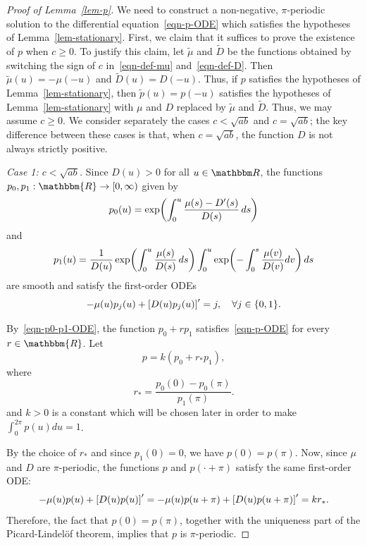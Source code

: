 \documentclass[11pt]{article}
\theoremstyle{plain}
\theoremstyle{definition}
\numberwithin{equation}{section}
\newcommand{\eqbn}{\begin{equation*}}
\newcommand{\eqen}{\end{equation*}}
\newcommand{\BB}{\mathbbm}
\newcommand{\rta}{\rightarrow}
\newcommand{\wt}{\widetilde}
\let\originalleft\left
\let\originalright\right
\renewcommand{\left}{\mathopen{}\mathclose\bgroup\originalleft}
\renewcommand{\right}{\aftergroup\egroup\originalright}
\begin{document}
  

\begin{proof}[Proof of Lemma~\ref{lem-p}]
We need to construct a non-negative, $\pi$-periodic solution to the differential equation~\eqref{eqn-p-ODE} which satisfies the hypotheses of Lemma~\ref{lem-stationary}. 
First, we claim that it suffices to prove the existence of $p$ when $c \geq 0$. To justify this claim, let $\wt \mu$ and $\wt D$ be the functions obtained by switching the sign of $c$ in~\eqref{eqn-def-mu} and~\eqref{eqn-def-D}.  Then $\wt \mu(u) = -\mu(-u)$ and $\wt D(u) = D(-u)$.  Thus, if $p$ satisfies the hypotheses of Lemma~\ref{lem-stationary}, then $\wt p(u) = p(-u)$ satisfies the hypotheses of Lemma~\ref{lem-stationary} with $\mu$ and $D$ replaced by $\wt \mu$ and $\wt D$. Thus, we may assume $c \geq 0$. We consider separately the cases  $c < \sqrt{ab}$ and $c = \sqrt{ab}$; the key difference between these cases is that, when $c = \sqrt{ab}$, the function $D$ is not always strictly positive.
\medskip

\noindent \emph{Case 1: $c < \sqrt{ab}$.}
Since $D(u) > 0$ for all $u\in\BB R$, the functions $p_0,p_1:\BB{R} \rta [0,\infty)$ given by 
\begin{equation}
p_0(u) =  \exp\left(\int_0^u \frac{\mu(s) - D'(s)}{D(s)} \, ds \right) 
\label{eqn-defn-p0}
\end{equation}
and
\begin{equation}
p_1(u) =  \frac{1}{D(u)} \exp\left(\int_0^u \frac{\mu(s)}{D(s)}\, ds \right)
\int_0^u \exp\left(-\int_0^s \frac{\mu(v)}{D(v)} dv \right)\, ds 
\label{eqn-defn-p1}
\end{equation}
are smooth and satisfy the first-order ODEs 
\begin{equation}
-\mu(u) p_j(u) +  \left[ D(u) p_j(u) \right]' = j, \quad \forall j \in \{0,1\} .
\label{eqn-p0-p1-ODE}
\end{equation}

By~\eqref{eqn-p0-p1-ODE}, the function $p_0 + r p_1$ satisfies~\eqref{eqn-p-ODE} for every $r \in \BB{R}$.  Let 
\[
p = k(p_0 + r_* p_1) , 
\]
where
\[
r_* = \frac{p_0(0) - p_0(\pi)}{p_1(\pi)}.
\]
and $k > 0$ is a constant which will be chosen later in order to make $\int_0^{2\pi} p(u) du = 1$.

By the choice of $r_*$ and since $p_1(0) = 0$, we have $p(0) = p(\pi)$.  Now, since $\mu$ and $D$ are $\pi$-periodic, the functions $p$ and $p(\cdot + \pi)$ satisfy the same first-order ODE:
\eqbn
-\mu(u) p(u) +  \left[ D(u) p(u) \right]' = 
-\mu(u) p(u + \pi) +  \left[ D(u) p(u + \pi) \right]' = k r_*.
\eqen
Therefore, the fact that $p(0) = p(\pi)$, together with the uniqueness part of the Picard-Lindel\"of theorem, implies that $p$ is $\pi$-periodic.  


\end{proof}
\end{document}
